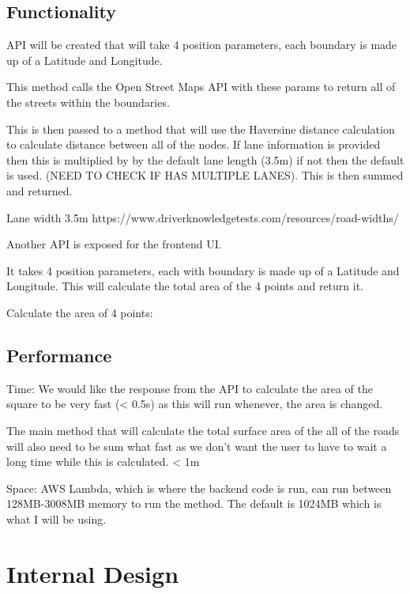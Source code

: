 \documentclass[a4paper,11pt]{article}
\begin{document}
\subsection{Functionality}


API will be created that will take 4 position parameters, each boundary is made up of a Latitude and Longitude.

This method calls the Open Street Maps API with these params to return all of the streets within the boundaries.

This is then passed to a method that will use the Haversine distance calculation to calculate distance between all of the nodes. If lane information is provided then this is multiplied by by the default lane length (3.5m) if not then the default is used. (NEED TO CHECK IF HAS MULTIPLE LANES). This is then summed and returned.

Lane width 3.5m https://www.driverknowledgetests.com/resources/road-widths/


Another API is exposed for the frontend UI.

It takes 4 position parameters, each with boundary is made up of a Latitude and Longitude. This will calculate the total area of the 4 points and return it.

Calculate the area of 4 points:

\subsection{Performance}


Time:
We would like the response from the API to calculate the area of the square to be very fast (< 0.5s) as this will run whenever, the area is changed.

The main method that will calculate the total surface area of the all of the roads will also need to be sum what fast as we don't want the user to have to wait a long time while this is calculated. < 1m

Space:
AWS Lambda, which is where the backend code is run, can run between 128MB-3008MB memory to run the method. The default is 1024MB which is what I will be using.


\section{Internal Design}
\end{document}
